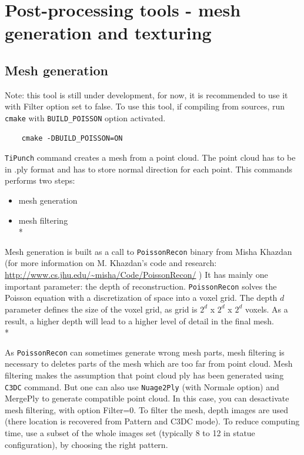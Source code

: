 
\section{Post-processing tools - mesh generation and texturing}

\subsection{Mesh generation}

Note: this tool is still under development, for now, it is recommended to use it with Filter option set to false. To use this tool, if compiling from sources, run {\tt cmake} with {\tt BUILD\_POISSON} option activated.
\begin{verbatim}
    cmake -DBUILD_POISSON=ON
\end{verbatim}

{\tt TiPunch} command creates a mesh from a point cloud. The point cloud has to be in .ply format and has to store normal direction for each point.
This commands performs two steps:
\begin{itemize}
\item mesh generation
\item mesh filtering\\*
\end{itemize}
Mesh generation is built as a call to {\tt PoissonRecon} binary from Misha Khazdan (for more information on M. Khazdan's code and research: \url{http://www.cs.jhu.edu/~misha/Code/PoissonRecon/} )
It has mainly one important parameter: the depth of reconstruction. {\tt PoissonRecon} solves the Poisson equation with a discretization of space into a voxel grid. The depth $d$ parameter defines the size of the voxel grid, as grid is $2^d$ x $2^d$ x $2^d$ voxels.
As a result, a higher depth will lead to a higher level of detail in the final mesh.\\*

As {\tt PoissonRecon} can sometimes generate wrong mesh parts, mesh filtering is necessary to deletes parts of the mesh which are too far from point cloud.
Mesh filtering makes the assumption that point cloud ply has been generated using {\tt C3DC} command. But one can also use {\tt Nuage2Ply} (with Normale option) and MergePly to generate compatible point cloud. In this case, you can desactivate mesh filtering, with option Filter=0.
To filter the mesh, depth images are used (there location is recovered from Pattern and C3DC mode). To reduce computing time, use a subset of the whole images set (typically 8 to 12 in statue configuration), by choosing the right pattern.

